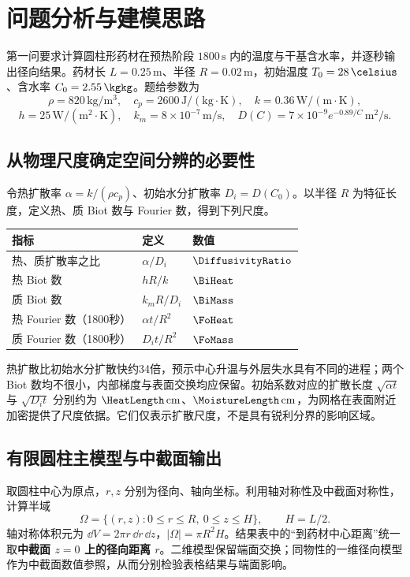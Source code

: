 \section{问题分析与建模思路}
第一问要求计算圆柱形药材在预热阶段 $1800\,\mathrm{s}$ 内的温度与干基含水率，并逐秒输出径向结果。药材长 $L=0.25\,\mathrm{m}$、半径 $R=0.02\,\mathrm{m}$，初始温度 $T_0=28\,\celsius$、含水率 $C_0=2.55\,\kgkg$。题给参数\cite{problem}为
\[
\rho=820\,\mathrm{kg/m^3},\quad c_p=2600\,\mathrm{J/(kg\cdot K)},\quad
k=0.36\,\mathrm{W/(m\cdot K)},
\]
\[
h=25\,\mathrm{W/(m^2\cdot K)},\quad k_m=8\times10^{-7}\,\mathrm{m/s},\quad
D(C)=7\times10^{-9}e^{-0.89/C}\,\mathrm{m^2/s}.
\]

\subsection{从物理尺度确定空间分辨的必要性}
令热扩散率 $\alpha=k/(\rho c_p)$、初始水分扩散率 $D_i=D(C_0)$。以半径 $R$ 为特征长度，定义热、质 Biot 数与 Fourier 数，得到下列尺度。
\begin{center}\small
\begin{tabular}{lll}
\toprule
指标 & 定义 & 数值\\\midrule
热、质扩散率之比 & $\alpha/D_i$ & $\DiffusivityRatio$\\
热 Biot 数 & $hR/k$ & $\BiHeat$\\
质 Biot 数 & $k_mR/D_i$ & $\BiMass$\\
热 Fourier 数（1800秒） & $\alpha t/R^2$ & $\FoHeat$\\
质 Fourier 数（1800秒） & $D_it/R^2$ & $\FoMass$\\
\bottomrule
\end{tabular}\end{center}
热扩散比初始水分扩散快约34倍，预示中心升温与外层失水具有不同的进程；两个 Biot 数均不很小，内部梯度与表面交换均应保留。初始系数对应的扩散长度 $\sqrt{\alpha t}$ 与 $\sqrt{D_it}$ 分别约为 $\HeatLength\,\mathrm{cm}$、$\MoistureLength\,\mathrm{cm}$，为网格在表面附近加密提供了尺度依据。它们仅表示扩散尺度，不是具有锐利分界的影响区域。

\subsection{有限圆柱主模型与中截面输出}
取圆柱中心为原点，$r,z$ 分别为径向、轴向坐标。利用轴对称性及中截面对称性，计算半域
\begin{equation}
\Omega=\{(r,z):0\le r\le R,\ 0\le z\le H\},\qquad H=L/2.
\label{eq:domain}
\end{equation}
轴对称体积元为 $\dd V=2\pi r\,\dd r\,\dd z$，$|\Omega|=\pi R^2H$。结果表中的“到药材中心距离”统一取\textbf{中截面 $z=0$ 上的径向距离 $r$}。二维模型保留端面交换；同物性的一维径向模型作为中截面数值参照，从而分别检验表格结果与端面影响。

